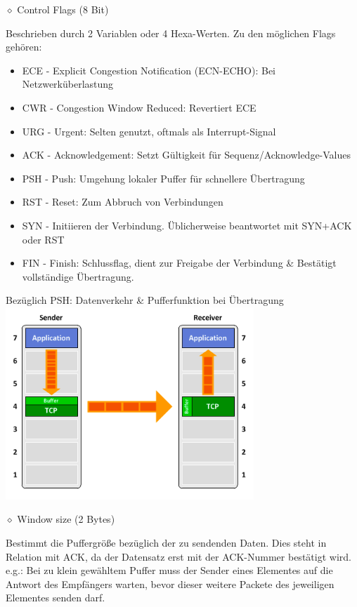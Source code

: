 \documentclass[11pt]{article}
\begin{document}
\begin{enumerate}[\thesection .1]
        $\diamond$ Control Flags (8 Bit)
        \begin{addmargin}[1em]{1em}
            Beschrieben durch 2 Variablen oder 4 Hexa-Werten.
            Zu den möglichen Flags gehören:
            \begin{itemize}
                \item ECE - Explicit Congestion Notification (ECN-ECHO): Bei Netzwerküberlastung
                \item CWR - Congestion Window Reduced: Revertiert ECE
                \item URG - Urgent: Selten genutzt, oftmals als Interrupt-Signal
                \item ACK - Acknowledgement: Setzt Gültigkeit für Sequenz/Acknowledge-Values
                \item PSH - Push: Umgehung lokaler Puffer für schnellere Übertragung
                \item RST - Reset: Zum Abbruch von Verbindungen
                \item SYN - Initiieren der Verbindung. Üblicherweise beantwortet mit SYN+ACK oder RST
                \item FIN - Finish: Schlussflag, dient zur Freigabe der Verbindung \& Bestätigt vollständige Übertragung.\\
            \end{itemize}
            \begin{center}
                Bezüglich PSH: Datenverkehr \& Pufferfunktion bei Übertragung
                \includegraphics[width=0.7\textwidth]{PSHAndBuffer.png}
            \end{center}
        \end{addmargin}

        $\diamond$ Window size (2 Bytes)
        \begin{addmargin}[1em]{1em}
            Bestimmt die Puffergröße bezüglich der zu sendenden Daten.
            Dies steht in Relation mit ACK, da der Datensatz erst mit der ACK-Nummer bestätigt wird.
            e.g.: Bei zu klein gewähltem Puffer muss der Sender eines Elementes auf die Antwort des Empfängers warten, bevor
            dieser weitere Packete des jeweiligen Elementes senden darf.
        \end{addmargin}


\end{enumerate}
\end{document}
